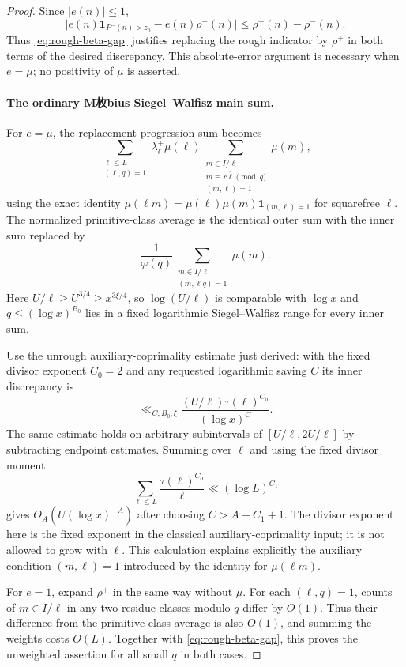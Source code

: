 \documentclass[11pt]{article}
\begin{document}
\begin{proof}
Since $|e(n)|\le1$,
\[
 \big|e(n)\mathbf1_{P^-(n)>z_0}-e(n)\rho^+(n)\big|
       \le\rho^+(n)-\rho^-(n).
\]
Thus \eqref{eq:rough-beta-gap} justifies replacing the rough
indicator by $\rho^+$ in both terms of the desired discrepancy.
This absolute-error argument is necessary when $e=\mu$;
no positivity of $\mu$ is asserted.

\paragraph{The ordinary M枚bius Siegel--Walfisz main sum.}
For $e=\mu$, the replacement progression sum becomes
\[
 \sum_{\substack{\ell\le L\\(\ell,q)=1}}
   \lambda^+_\ell\mu(\ell)
 \sum_{\substack{m\in I/\ell\\
             m\equiv r\bar\ell\pmod q\\(m,\ell)=1}}\mu(m),
\]
using the exact identity
$\mu(\ell m)=\mu(\ell)\mu(m)\mathbf1_{(m,\ell)=1}$
for squarefree $\ell$.
The normalized primitive-class average is the identical outer
sum with the inner sum replaced by
\[
 \frac1{\varphi(q)}
       \sum_{\substack{m\in I/\ell\\(m,\ell q)=1}}\mu(m).
\]
Here $U/\ell\ge U^{3/4}\ge x^{3\xi/4}$, so
$\log(U/\ell)$ is comparable with $\log x$ and
$q\le(\log x)^{B_0}$ lies in a fixed logarithmic
Siegel--Walfisz range for every inner sum.

Use the unrough auxiliary-coprimality estimate just derived:
with the fixed divisor exponent $C_0=2$ and any requested
logarithmic saving $C$ its inner discrepancy is
\[
 \ll_{C,B_0,\xi}
       \frac{(U/\ell)\tau(\ell)^{C_0}}{(\log x)^C}.
\]
The same estimate holds on arbitrary subintervals of
$[U/\ell,2U/\ell]$ by subtracting endpoint estimates.
Summing over $\ell$ and using the fixed divisor moment
\[
 \sum_{\ell\le L}\frac{\tau(\ell)^{C_0}}{\ell}
                   \ll(\log L)^{C_1}
\]
gives $O_A(U(\log x)^{-A})$ after choosing
$C>A+C_1+1$. The divisor exponent here is the fixed exponent
in the classical auxiliary-coprimality input; it is not
allowed to grow with $\ell$.
This calculation explains explicitly the auxiliary condition
$(m,\ell)=1$ introduced by the identity for $\mu(\ell m)$.

For $e=1$, expand $\rho^+$ in the same way without $\mu$.
For each $(\ell,q)=1$, counts of $m\in I/\ell$ in any two
residue classes modulo $q$ differ by $O(1)$.
Thus their difference from the primitive-class average
is also $O(1)$, and summing the weights costs $O(L)$.
Together with \eqref{eq:rough-beta-gap}, this proves the
unweighted assertion for all small $q$ in both cases.


\end{proof}
\end{document}
